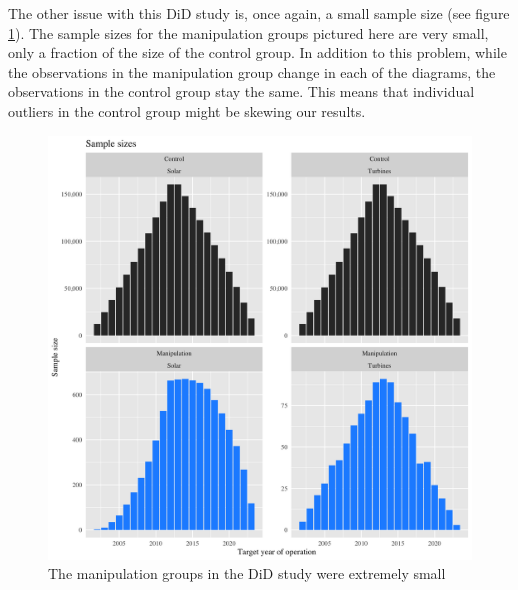 \documentclass{article}
\begin{document}
The other issue with this DiD study is, once again, a small sample size (see figure \ref{study1samplesize}). 
The sample sizes for the manipulation groups pictured here are very small, only a fraction of the size of the control group.
In addition to this problem, while the observations in the manipulation group change in each of the diagrams, the observations in the control group stay the same.
This means that individual outliers in the control group might be skewing our results.
\begin{figure}[h]
\centering
\includegraphics[width=0.9\linewidth]
{study1_sample_size.png} 
\caption{The manipulation groups in the DiD study were extremely small}
\label{study1samplesize}
\end{figure}
\end{document}
